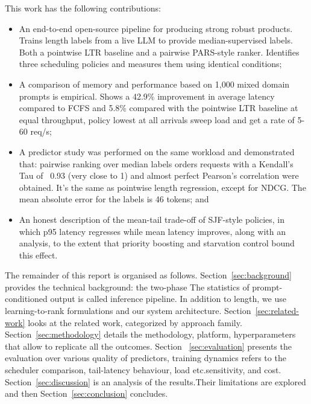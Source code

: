 \documentclass[conference]{IEEEtran}
\begin{document}
This work has the following contributions:

\begin{itemize}
\item An end-to-end open-source pipeline for producing strong robust products. Trains length labels from a live LLM to provide median-supervised labels. Both a pointwise LTR baseline and a pairwise PARS-style ranker. Identifies three scheduling policies and measures them using identical conditions;

\item A comparison of memory and performance based on 1,000 mixed domain prompts is empirical. Shows a 42.9\% improvement in average latency compared to FCFS and 5.8\% compared with the pointwise LTR baseline at equal throughput, policy lowest at all arrivals sweep load and get a rate of 5-60 req/s;

\item A predictor study was performed on the same workload and demonstrated that: pairwise ranking over median labels orders requests with a Kendall's Tau of ~0.93 (very close to 1) and almost perfect Pearson's correlation were obtained. It's the same as pointwise length regression, except for NDCG. The mean absolute error for the labels is 46 tokens; and

\item An honest description of the mean-tail trade-off of SJF-style policies, in which p95 latency regresses while mean latency improves, along with an analysis, to the extent that priority boosting and starvation control bound this effect.
\end{itemize}

The remainder of this report is organised as follows.
Section~\ref{sec:background} provides the technical background: the two-phase
The statistics of prompt-conditioned output is called inference pipeline. In addition to length, we use learning-to-rank formulations and our system architecture. Section~\ref{sec:related-work} looks at the related work, categorized by approach family. Section~\ref{sec:methodology} details the methodology, platform, hyperparameters that allow to replicate all the outcomes. Section ~\ref{sec:evaluation} presents the evaluation over various quality of predictors, training dynamics refers to the scheduler comparison, tail-latency behaviour, load etc.sensitivity, and cost. Section~\ref{sec:discussion} is an analysis of the results.Their limitations are explored and then Section~\ref{sec:conclusion} concludes.
\end{document}
